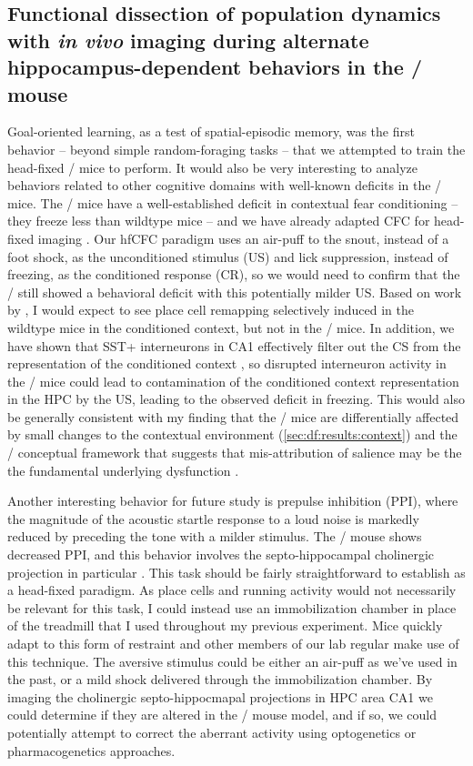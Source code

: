 \subsection{Functional dissection of population dynamics with \emph{in vivo} imaging during alternate hippocampus-dependent behaviors in the \df/ mouse}
Goal-oriented learning, as a test of spatial-episodic memory, was the first behavior -- beyond simple random-foraging tasks -- that we attempted to train the head-fixed \df/ mice to perform.
It would also be very interesting to analyze behaviors related to other cognitive domains with well-known deficits in the \df/ mice.
The \df/ mice have a well-established deficit in contextual fear conditioning \citep[CFC,][]{Stark2008} -- they freeze less than wildtype mice -- and we have already adapted CFC for head-fixed imaging \citep[hfCFC,][]{Lovett-Barron2014}.
Our hfCFC paradigm uses an air-puff to the snout, instead of a foot shock, as the unconditioned stimulus (US) and lick suppression, instead of freezing, as the conditioned response (CR), so we would need to confirm that the \df/ still showed a behavioral deficit with this potentially milder US.
Based on work by \citeauthor{Moita2004} \citep{Moita2004}, I would expect to see place cell remapping selectively induced in the wildtype mice in the conditioned context, but not in the \df/ mice.
In addition, we have shown that SST+ interneurons in CA1 effectively filter out the CS from the representation of the conditioned context \citep{Lovett-Barron2014}, so disrupted interneuron activity in the \df/ mice could lead to contamination of the conditioned context representation in the \ac{HPC} by the US, leading to the observed deficit in freezing.
This would also be generally consistent with my finding that the \df/ mice are differentially affected by small changes to the contextual environment (\autoref{sec:df:results:context}) and the \scz/ conceptual framework that suggests that mis-attribution of salience may be the the fundamental underlying dysfunction \citep{Kapur2003a, VanOs2009}.

Another interesting behavior for future study is prepulse inhibition (PPI), where the magnitude of the acoustic startle response to a loud noise is markedly reduced by preceding the tone with a milder stimulus.
The \df/ mouse shows decreased PPI, and this behavior involves the septo-hippocampal cholinergic projection in particular \citep{Koch1996, Swerdlow2001}.
This task should be fairly straightforward to establish as a head-fixed paradigm.
As place cells and running activity would not necessarily be relevant for this task, I could instead use an immobilization chamber in place of the treadmill that I used throughout my previous experiment.
Mice quickly adapt to this form of restraint and other members of our lab regular make use of this technique.
The aversive stimulus could be either an air-puff as we've used in the past, or a mild shock delivered through the immobilization chamber.
By imaging the cholinergic septo-hippocmapal projections in HPC area CA1 we could determine if they are altered in the \df/ mouse model, and if so, we could potentially attempt to correct the aberrant activity using optogenetics or pharmacogenetics approaches.

